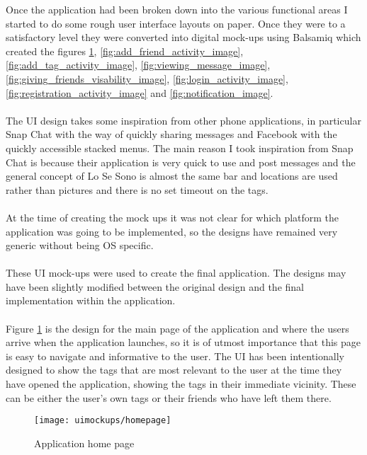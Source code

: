 Once the application had been broken down into the various functional areas I started to do some rough user interface layouts on paper. Once they were to a satisfactory level they were converted into digital mock-ups using Balsamiq which created the figures \ref{fig:application_home_page_image}, \ref{fig:add_friend_activity_image}, \ref{fig:add_tag_activity_image}, \ref{fig:viewing_message_image}, \ref{fig:giving_friends_visability_image}, \ref{fig:login_activity_image}, \ref{fig:registration_activity_image} and \ref{fig:notification_image}. \\
\\
The UI design takes some inspiration from other phone applications, in particular Snap Chat with the way of quickly sharing messages and Facebook with the quickly accessible stacked menus. The main reason I took inspiration from Snap Chat is because their application is very quick to use and post messages and the general concept of Lo Se Sono is almost the same bar and locations are used rather than pictures and there is no set timeout on the tags.\\
\\
At the time of creating the mock ups it was not clear for which platform the application was going to be implemented, so the designs have remained very generic without being OS specific.\\
\\
These UI mock-ups were used to create the final application. The designs may have been slightly modified between the original design and the final implementation within the application.\\
\\
Figure \ref{fig:application_home_page_image} is the design for the main page of the application and where the users arrive when the application launches, so it is of utmost importance that this page is easy to navigate and informative to the user. The UI has been intentionally designed to show the tags that are most relevant to the user at the time they have opened the application, showing the tags in their immediate vicinity. These can be either the user's own tags or their friends who have left them there.\\

\begin{figure}[htb!]
    \centering
    \texttt{[image: uimockups/homepage]}
    \caption{Application home page}
    \label{fig:application_home_page_image}
\end{figure}

